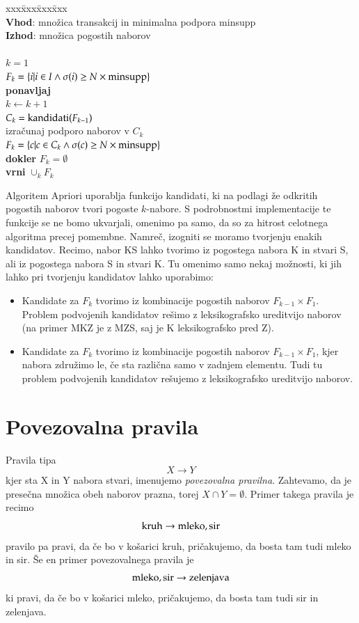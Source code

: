 \begin{tabbing}
xxx\=xxx\=xxx\=xxx \kill\\
{\bf Vhod}: množica transakcij in minimalna podpora minsupp \\
{\bf Izhod}: množica pogostih naborov \\
\\
$k=1$ \\
$F_k=\{i|i\in I\land\sigma(i)\geq N\times{\rm minsupp}\}$ \\
{\bf ponavljaj} \\
\> $k\leftarrow k+1$ \\
\> $C_k={\rm kandidati}(F_{k-1})$ \\
\> izračunaj podporo naborov v $C_k$ \\
\> $F_k=\{c | c\in C_k\land\sigma(c)\geq N\times{\rm minsupp}\}$ \\
{\bf dokler} $F_k=\emptyset$ \\
{\bf vrni} $\cup_k F_k$ \\
\end{tabbing}

Algoritem Apriori uporablja funkcijo kandidati, ki na podlagi že odkritih pogostih naborov tvori pogoste $k$-nabore. S podrobnostmi implementacije te funkcije se ne bomo ukvarjali, omenimo pa samo, da so za hitrost celotnega algoritma precej pomembne. Namreč, izogniti se moramo tvorjenju enakih kandidatov. Recimo, nabor KS lahko tvorimo iz pogostega nabora K in stvari S, ali iz pogostega nabora S in stvari K. Tu omenimo samo nekaj možnosti, ki jih lahko pri tvorjenju kandidatov lahko uporabimo:
\begin{itemize}
\item Kandidate za $F_k$ tvorimo iz kombinacije pogostih naborov $F_{k-1}\times F_1$. Problem podvojenih kandidatov rešimo z leksikografsko ureditvijo naborov (na primer MKZ je z MZS, saj je K leksikografsko pred Z).
\item Kandidate za $F_k$ tvorimo iz kombinacije pogostih naborov $F_{k-1}\times F_1$, kjer nabora združimo le, če sta različna samo v zadnjem elementu. Tudi tu problem podvojenih kandidatov rešujemo z leksikografsko ureditvijo naborov.
\end{itemize}

\section{Povezovalna pravila}

Pravila tipa
$$ X\rightarrow Y $$
kjer sta X in Y nabora stvari, imenujemo {\em povezovalna pravilna}. Zahtevamo, da je presečna množica obeh naborov prazna, torej $X\cap Y=\emptyset$. Primer takega pravila je recimo
$$ {\rm kruh}\to {\rm mleko}, {\rm sir}$$
pravilo pa pravi, da če bo v košarici kruh, pričakujemo, da bosta tam tudi mleko in sir. Še en primer povezovalnega pravila je
$$ {\rm mleko}, {\rm sir}\to {\rm zelenjava} $$
ki pravi, da če bo v košarici mleko, pričakujemo, da bosta tam tudi sir in zelenjava.


